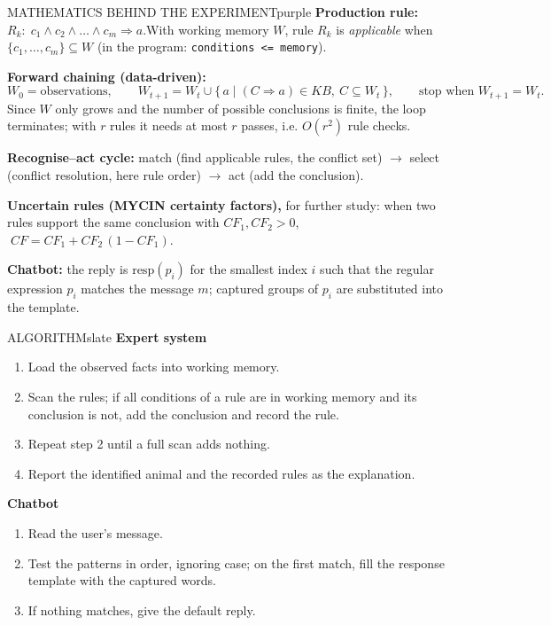 \documentclass[11pt,a4paper]{article}
\newenvironment{maths}{\begin{secbox}{MATHEMATICS BEHIND THE EXPERIMENT}{purple}}{\end{secbox}}
\newenvironment{algorithm}{\begin{secbox}{ALGORITHM}{slate}}{\end{secbox}}
\begin{document}
\begin{maths}
\textbf{Production rule:}\quad $R_k:\; c_1\land c_2\land\dots\land c_m \Rightarrow a$.\quad With working memory $W$, rule $R_k$ is \emph{applicable} when $\{c_1,\dots,c_m\}\subseteq W$ (in the program: \texttt{conditions <= memory}).

\textbf{Forward chaining (data-driven):}
\[ W_0=\text{observations},\qquad W_{t+1}=W_t\cup\{\,a \mid (C\Rightarrow a)\in KB,\ C\subseteq W_t\,\},\qquad \text{stop when } W_{t+1}=W_t . \]
Since $W$ only grows and the number of possible conclusions is finite, the loop terminates; with $r$ rules it needs at most $r$ passes, i.e. $O(r^{2})$ rule checks.

\textbf{Recognise--act cycle:} match (find applicable rules, the conflict set) $\to$ select (conflict resolution, here rule order) $\to$ act (add the conclusion).

\textbf{Uncertain rules (MYCIN certainty factors),} for further study: when two rules support the same conclusion with $CF_1, CF_2 > 0$,
$\;CF = CF_1 + CF_2\,(1-CF_1)$.

\textbf{Chatbot:} the reply is $\mathrm{resp}(p_i)$ for the smallest index $i$ such that the regular expression $p_i$ matches the message $m$; captured groups of $p_i$ are substituted into the template.
\end{maths}

\begin{algorithm}
\textbf{Expert system}
\begin{enumerate}
  \item Load the observed facts into working memory.
  \item Scan the rules; if all conditions of a rule are in working memory and its conclusion is not, add the conclusion and record the rule.
  \item Repeat step 2 until a full scan adds nothing.
  \item Report the identified animal and the recorded rules as the explanation.
\end{enumerate}
\textbf{Chatbot}
\begin{enumerate}
  \item Read the user's message.
  \item Test the patterns in order, ignoring case; on the first match, fill the response template with the captured words.
  \item If nothing matches, give the default reply.
\end{enumerate}
\end{algorithm}
\end{document}

